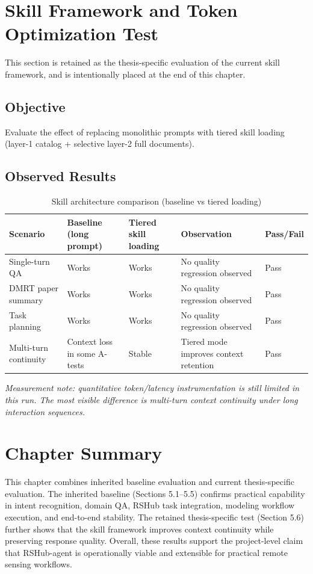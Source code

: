 \section{Skill Framework and Token Optimization Test}
\label{sec:test-skill-token}

This section is retained as the thesis-specific evaluation of the current skill framework, and is intentionally placed at the end of this chapter.

\subsection{Objective}
Evaluate the effect of replacing monolithic prompts with tiered skill loading (layer-1 catalog + selective layer-2 full documents).

\subsection{Observed Results}
\begin{table}[H]
	\centering
	\caption{Skill architecture comparison (baseline vs tiered loading)}
	\label{tab:skill-token}
	{\footnotesize
		\setlength{\tabcolsep}{2.5pt}
		\renewcommand{\arraystretch}{1.1}
		\begin{tabular}{p{2.4cm}p{2.6cm}p{2.6cm}p{4.4cm}p{1.1cm}}
			\hline
			Scenario & Baseline (long prompt) & Tiered skill loading & Observation & Pass/Fail \\
			\hline
			Single-turn QA & Works & Works & No quality regression observed & Pass \\
			DMRT paper summary & Works & Works & No quality regression observed & Pass \\
			Task planning & Works & Works & No quality regression observed & Pass \\
			Multi-turn continuity & Context loss in some A-tests & Stable & Tiered mode improves context retention & Pass \\
			\hline
		\end{tabular}
	}
\end{table}
\noindent\textit{Measurement note: quantitative token/latency instrumentation is still limited in this run. The most visible difference is multi-turn context continuity under long interaction sequences.}

\section{Chapter Summary}

This chapter combines inherited baseline evaluation and current thesis-specific evaluation.
The inherited baseline (Sections 5.1--5.5) confirms practical capability in intent recognition, domain QA, RSHub task integration, modeling workflow execution, and end-to-end stability.
The retained thesis-specific test (Section 5.6) further shows that the skill framework improves context continuity while preserving response quality.
Overall, these results support the project-level claim that RSHub-agent is operationally viable and extensible for practical remote sensing workflows.
